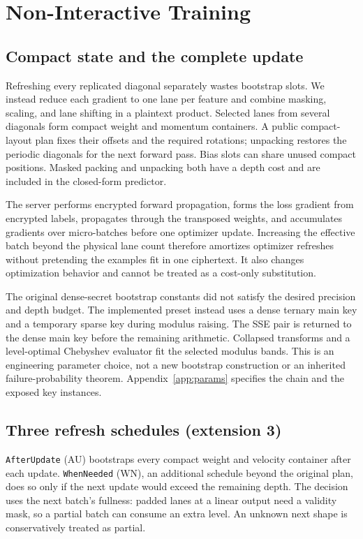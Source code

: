 \section{Non-Interactive Training}
\label{sec:noninteractive}
\subsection{Compact state and the complete update}
Refreshing every replicated diagonal separately wastes bootstrap slots. We instead reduce each gradient to one lane per feature and combine masking, scaling, and lane shifting in a plaintext product. Selected lanes from several diagonals form compact weight and momentum containers. A public compact-layout plan fixes their offsets and the required rotations; unpacking restores the periodic diagonals for the next forward pass. Bias slots can share unused compact positions. Masked packing and unpacking both have a depth cost and are included in the closed-form predictor.

The server performs encrypted forward propagation, forms the loss gradient from encrypted labels, propagates through the transposed weights, and accumulates gradients over micro-batches before one optimizer update. Increasing the effective batch beyond the physical lane count therefore amortizes optimizer refreshes without pretending the examples fit in one ciphertext. It also changes optimization behavior and cannot be treated as a cost-only substitution.

The original dense-secret bootstrap constants did not satisfy the desired precision and depth budget. The implemented preset instead uses a dense ternary main key and a temporary sparse key during modulus raising. The SSE pair is returned to the dense main key before the remaining arithmetic. Collapsed transforms and a level-optimal Chebyshev evaluator fit the selected modulus bands. This is an engineering parameter choice, not a new bootstrap construction or an inherited failure-probability theorem. Appendix~\ref{app:params} specifies the chain and the exposed key instances.

\subsection{Three refresh schedules (extension 3)}
\texttt{AfterUpdate} (AU) bootstraps every compact weight and velocity container after each update. \texttt{WhenNeeded} (WN), an additional schedule beyond the original plan, does so only if the next update would exceed the remaining depth. The decision uses the next batch's fullness: padded lanes at a linear output need a validity mask, so a partial batch can consume an extra level. An unknown next shape is conservatively treated as partial.

